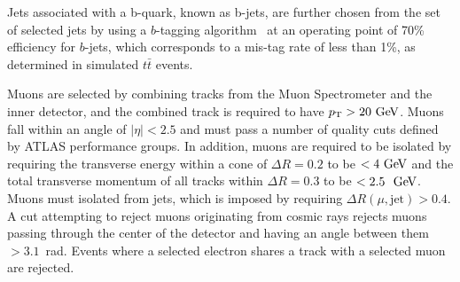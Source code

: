 
Jets associated with a b-quark, known as b-jets, are further chosen from the set of selected jets by using a $b$-tagging algorithm~\cite{ATLAS-CONF-2012-043} at an operating point of 70\% efficiency for $b$-jets, which corresponds to a mis-tag rate of less than 1\%, as determined in simulated $t\bar{t}$ events.


Muons are selected by combining tracks from the Muon Spectrometer and the inner detector, and the combined track is required to have $\pt>20 \GeV$.
Muons fall within an angle of $|\eta|<2.5$ and must pass a number of quality cuts defined by ATLAS performance groups.
In addition, muons are required to be isolated by requiring the transverse energy within a cone of $\Delta R = 0.2$ to be $<4\GeV{}$ and the total transverse momentum of all tracks within $\Delta R = 0.3$ to be $<2.5~\GeV{}$.
Muons must isolated from jets, which is imposed by requiring $\Delta R(\mu,\mathrm{jet})>0.4$.
A cut attempting to reject muons originating from cosmic rays rejects muons passing through the center of the detector and having an angle between them $>3.1$~rad.
Events where a selected electron shares a track with a selected muon are rejected.

